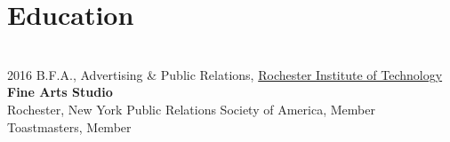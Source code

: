 \documentclass[letterpaper]{twentysecondcv} %
\begin{document}
\makeprofile %

\vspace{.8cm}
\section{Education}

\begin{twenty} %
	\twentyitem
    	{\\ 2016}
        {B.F.A., Advertising \& Public Relations,}
        {\href{http://www.rit.edu/}{Rochester Institute of Technology}}
        {\textbf{Fine Arts Studio} \\ Rochester, New York}
        {Public Relations Society of America, Member \\ Toastmasters, Member}
	
\end{twenty}
\end{document}
